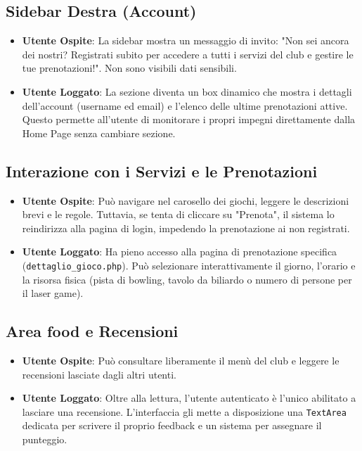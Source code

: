 \documentclass[a4paper, twoside]{report}
\begin{document}
\subsection*{Sidebar Destra (Account)}
\begin{itemize}
  \item \textbf{Utente Ospite}: La sidebar mostra un messaggio di invito: "Non sei ancora dei nostri? Registrati subito per accedere a tutti i servizi del club e gestire le tue prenotazioni!". Non sono visibili dati sensibili.
  \item \textbf{Utente Loggato}: La sezione diventa un box dinamico che mostra i dettagli dell'account (username ed email) e l'elenco delle ultime prenotazioni attive. Questo permette all'utente di monitorare i propri impegni direttamente dalla Home Page senza cambiare sezione.
\end{itemize}
\subsection*{Interazione con i Servizi e le Prenotazioni}
\begin{itemize}
  \item \textbf{Utente Ospite}: Può navigare nel carosello dei giochi, leggere le descrizioni brevi e le regole. Tuttavia, se tenta di cliccare su "Prenota", il sistema lo reindirizza alla pagina di login, impedendo la prenotazione ai non registrati.
  \item \textbf{Utente Loggato}: Ha pieno accesso alla pagina di prenotazione specifica (\texttt{dettaglio\_gioco.php}). Può selezionare interattivamente il giorno, l'orario e la risorsa fisica (pista di bowling, tavolo da biliardo o numero di persone per il laser game).
\end{itemize}
\subsection*{Area food e Recensioni}
\begin{itemize}
  \item \textbf{Utente Ospite}: Può consultare liberamente il menù del club e leggere le recensioni lasciate dagli altri utenti.
  \item \textbf{Utente Loggato}: Oltre alla lettura, l'utente autenticato è l'unico abilitato a lasciare una recensione. L'interfaccia gli mette a disposizione una \texttt{TextArea} dedicata per scrivere il proprio feedback e un sistema per assegnare il punteggio.
\end{itemize}
\end{document}
